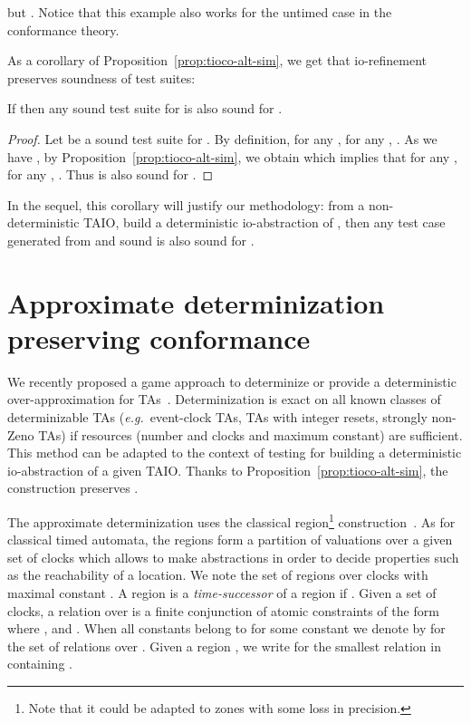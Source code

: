 \documentclass{LMCS}
\theoremstyle{plain}\newtheorem{proposition}[thm]{Proposition}
\def\eg{{\em e.g.}}
\begin{document}
but  .
Notice that this example also works for the untimed case in the  conformance theory.


As a corollary of Proposition~\ref{prop:tioco-alt-sim}, we get that
io-refinement preserves soundness of test suites:
\begin{cor}
\label{cor}
If  
then any sound test suite for  is also sound for .
\end{cor}
\begin{proof}
Let  be a  sound test suite for .
By definition, for any , for any , .
As we have , by Proposition~\ref{prop:tioco-alt-sim}, 
we obtain 
which implies 
that for any , for any , .
Thus  is also sound for .
\end{proof}
In the sequel, this corollary will justify 
our methodology:
from  a non-deterministic TAIO, 
build a deterministic io-abstraction  of ,
then any test case generated from  and sound
is also sound for .
 

\section{Approximate determinization preserving conformance}
\label{sec-determinisation}

We recently proposed a game approach to determinize or provide a
deterministic over-approximation for TAs~\cite{BertrandStainerJeronKrichen-FOSSACS2011}.
Determinization is exact on all known classes of determinizable TAs
(\eg  ~event-clock TAs, TAs with integer resets, strongly non-Zeno TAs) if
resources (number and clocks and maximum constant) are sufficient.  
This
method can be adapted to the context of testing for building a
deterministic io-abstraction of a given TAIO. Thanks to
Proposition~\ref{prop:tioco-alt-sim}, the construction preserves
.



The approximate determinization uses the classical region\footnote{Note that it could be adapted to zones with some loss in precision.}
construction~\cite{AlurDill94}.  As for classical timed automata, the
regions form a partition of valuations over a given set of clocks
which allows to make abstractions in order to decide properties such as
the reachability of a
location.  We note  the set of regions over clocks  with maximal
constant .  A region  is a {\em time-successor} of a region 
if .  Given
   a set of clocks, a relation over  is a finite conjunction 
  of atomic constraints of the form  where ,
   and . When all constants  belong
  to  for some constant  we denote by
   for the set of relations over .
Given a region , we write  for the smallest
relation in  containing . 
\end{document}
